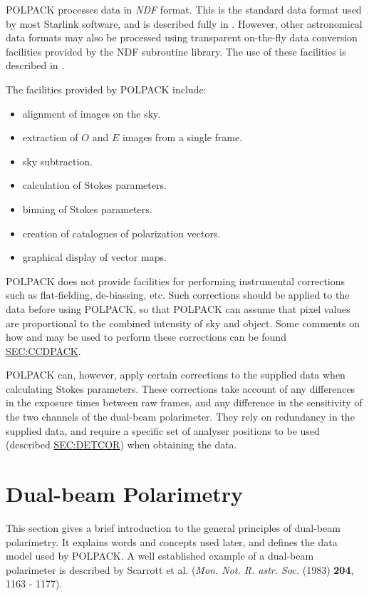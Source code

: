 POLPACK processes data in {\em NDF} format. This is the standard data
format used by most Starlink software, and is described fully in
. However, other astronomical data formats may also
be processed using transparent on-the-fly data conversion facilities
provided by the NDF subroutine library. The use of these facilities is
described in .

The facilities provided by POLPACK include:

\begin{itemize}
\item alignment of images on the sky.
\item extraction of $O$ and $E$ images from a single frame.
\item sky subtraction.
\item calculation of Stokes parameters.
\item binning of Stokes parameters.
\item creation of catalogues of polarization vectors.
\item graphical display of vector maps.
\end{itemize}

POLPACK does not provide facilities for performing instrumental
corrections such as flat-fielding, de-biassing, etc. Such corrections
should be applied to the data before using POLPACK, so that POLPACK can
assume that pixel values are proportional to the combined intensity of sky and
object. Some comments on how  and
 may be used to perform these corrections can be found
\hyperref{here}{in section }{}{SEC:CCDPACK}. 

POLPACK can, however, apply certain corrections to the supplied data when
calculating Stokes parameters. These corrections take account of any
differences in the exposure times between raw frames, and any difference
in the sensitivity of the two channels of the dual-beam polarimeter. They
rely on redundancy in the supplied data, and require a specific set of
analyser positions to be used (described \hyperref{here}{in section }{}
{SEC:DETCOR}) when obtaining the data.

\section{\label{SEC:DBPOL}Dual-beam Polarimetry}
This section gives a brief introduction to the general principles of
dual-beam polarimetry. It explains words and concepts used later, and
defines the data model used by POLPACK. A well established example of a
dual-beam polarimeter is described by Scarrott et al. ({\em Mon. Not. R.
astr. Soc.} (1983) {\bf 204}, 1163 - 1177).

